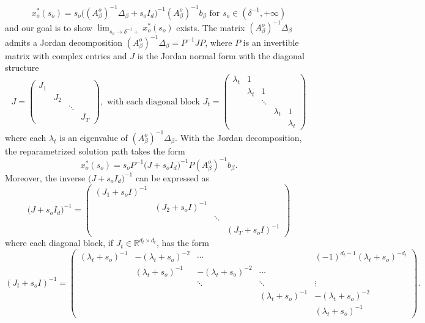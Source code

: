 \documentclass[mnsc,blindrev]{informs4} %
\newcommand{\R}{\mathbb{R}}
\newcommand{\prth}[1]{\left(#1\right)}
\begin{document}
$$x^*_o(s_o)=s_o\big((A_{\beta}^o)^{-1}\Delta_{\beta}+s_oI_d\big)^{-1}(A_{\beta}^o)^{-1}b_{\beta}\text{ for }s_o\in(\delta^{-1},+\infty)$$
and our goal is to show $\lim_{s_o\to \delta^{-1}+}x^*_o(s_o)$ exists. The matrix $(A_{\beta}^o)^{-1}\Delta_{\beta}$ admits a Jordan decomposition $(A_{\beta}^o)^{-1}\Delta_{\beta}=P^{-1}JP$, where $P$ is an invertible matrix with complex entries and $J$ is the Jordan normal form with the diagonal structure
\begin{equation*}
    J=\prth{\begin{matrix} %
      J_1 & && \\
       &J_2& & \\
       &&\ddots&\\
       &&&J_T
   \end{matrix}}, \text{ with each diagonal block }J_t=\prth{\begin{matrix} %
      \lambda_t &1 && &\\
       &\lambda_t&1 & &\\
       &&\ddots&&\\
       &&&\lambda_t&1\\
       &&&&\lambda_t
   \end{matrix}}
\end{equation*}
where each $\lambda_t$ is an eigenvalue of $(A_{\beta}^o)^{-1}\Delta_{\beta}$. With the Jordan decomposition, the reparametrized solution path takes the form
$$x^*_o(s_o)=s_oP^{-1}\big(J+s_oI_d\big)^{-1}P(A_{\beta}^o)^{-1}b_{\beta}.$$
Moreover, the inverse $\big(J+s_oI_d\big)^{-1}$ can be expressed as
\begin{equation*}
    \big(J+s_oI_d\big)^{-1}=\prth{\begin{matrix} %
      (J_1+s_oI)^{-1} & && \\
       &(J_2+s_oI)^{-1}& & \\
       &&\ddots&\\
       &&&(J_T+s_oI)^{-1}
   \end{matrix}}
\end{equation*}
where each diagonal block, if $J_t\in \R^{d_t\times d_t}$, has the form
\begin{equation}\label{inverse of Jordan form}
    (J_t+s_oI)^{-1}=\prth{\begin{matrix} %
      (\lambda_t+s_o)^{-1} &-(\lambda_t+s_o)^{-2} &\cdots& &(-1)^{d_t-1}(\lambda_t+s_o)^{-d_t}\\
       &(\lambda_t+s_o)^{-1}&-(\lambda_t+s_o)^{-2} &\cdots &\\
       &&\ddots&\ddots&\vdots\\
       &&&(\lambda_t+s_o)^{-1}&-(\lambda_t+s_o)^{-2}\\
       &&&&(\lambda_t+s_o)^{-1}
   \end{matrix}}.
\end{equation}
\end{document}
